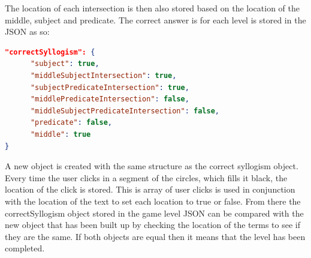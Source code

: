 \documentclass[12pt,a4paper]{report}
\begin{document}
The location of each intersection is then also stored based on the location of the middle, subject and predicate.
The correct answer is for each level is stored in the JSON as so:
\begin{lstlisting}[language=json]
"correctSyllogism": {
      "subject": true,
      "middleSubjectIntersection": true,
      "subjectPredicateIntersection": true,
      "middlePredicateIntersection": false,
      "middleSubjectPredicateIntersection": false,
      "predicate": false,
      "middle": true
}
\end{lstlisting}

A new object is created with the same structure as the correct syllogism object.
Every time the user clicks in a segment of the circles, which fills it black, the location of the click is stored. This is array of user clicks is used in conjunction with the location of the text to set each location to true or false. From there the correctSyllogism object stored in the game level JSON can be compared with the new object that has been built up by checking the location of the terms to see if they are the same. If both objects are equal then it means that the level has been completed.




 
\end{document}
